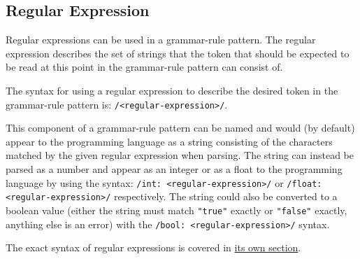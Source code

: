 
\subsection{Regular Expression}
{
	Regular expressions can be used in a grammar-rule pattern.
	The regular expression describes the set of strings that the token
	that should be
	expected
	to be read at this point in the grammar-rule pattern can consist of.
	
	The syntax for using a regular expression to describe the desired token
	in the grammar-rule pattern is: \texttt{/<regular-expression>/}.
	
	This component of a grammar-rule pattern can be named and would (by default)
	appear to
	the programming language as a string consisting of the characters matched
	by the given regular expression when parsing.
	The string can instead be
	parsed as a number and appear
	as an integer or as a float to the programming language
	by using the syntax:
	\texttt{/int: <regular-expression>/} or
	\texttt{/float: <regular-expression>/} respectively.
	The string could also be converted to a boolean value (either the string
	must match \texttt{"true"} exactly or \texttt{"false"} exactly,
	anything else is an error)
	with the \texttt{/bool: <regular-expression>/} syntax.
	
	The exact syntax of regular expressions is covered in
	\hyperref[sec:regex]{its own section}.
}
